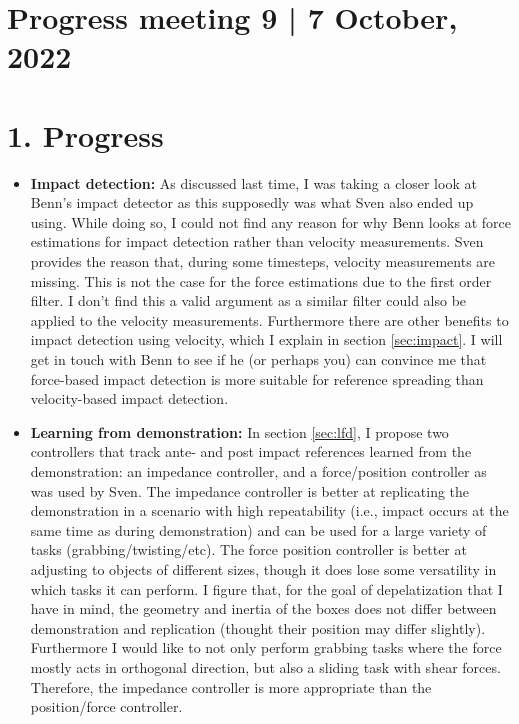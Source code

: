 \documentclass[11pt]{report}
\numberwithin{equation}{section}        %
\numberwithin{figure}{section}          %
\numberwithin{table}{section}           %
\begin{document}
  \section*{Progress meeting 9 | 7 October, 2022}


  \section*{1. Progress}
  \begin{itemize}
  \item \textbf{Impact detection:} As discussed last time, I was taking a closer look at Benn's impact detector as this supposedly was what Sven also ended up using. While doing so, I could not find any reason for why Benn looks at force estimations for impact detection rather than velocity measurements. Sven provides the reason that, during some timesteps, velocity measurements are missing. This is not the case for the force estimations due to the first order filter. I don't find this a valid argument as a similar filter could also be applied to the velocity measurements. Furthermore there are other benefits to impact detection using velocity, which I explain in section \ref{sec:impact}. I will get in touch with Benn to see if he (or perhaps you) can convince me that force-based impact detection is more suitable for reference spreading than velocity-based impact detection.
    
  \item \textbf{Learning from demonstration:} In section \ref{sec:lfd}, I propose two controllers that track ante- and post impact references learned from the demonstration: an impedance controller, and a force/position controller as was used by Sven. 
  The impedance controller is better at replicating the demonstration in a scenario with high repeatability (i.e., impact occurs at the same time as during demonstration) and can be used for a large variety of tasks (grabbing/twisting/etc). The force position controller is better at adjusting to objects of different sizes, though it does lose some versatility in which tasks it can perform. I figure that, for the goal of depelatization that I have in mind, the geometry and inertia of the boxes does not differ between demonstration and replication (thought their position may differ slightly). Furthermore I would like to not only perform grabbing tasks where the force mostly acts in orthogonal direction, but also a sliding task with shear forces. Therefore, the impedance controller is more appropriate than the position/force controller.


\end{itemize}
\end{document}
